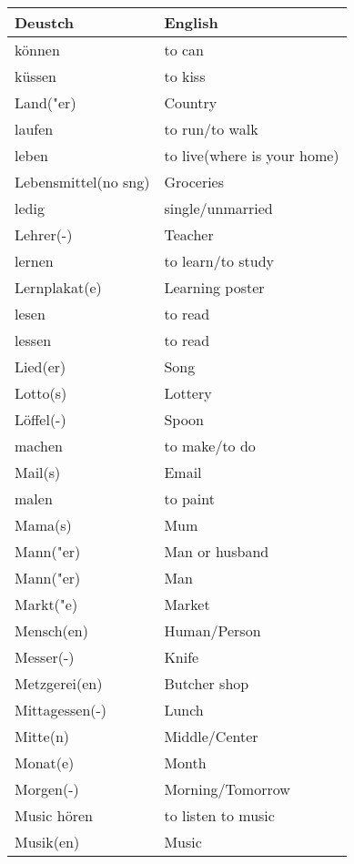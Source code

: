 \documentclass{article}
\renewcommand{\arraystretch}{1}
\begin{document}
\newpage

\begin{minipage}{0.48\textwidth}
    \centering
    \renewcommand{\arraystretch}{1.5}
    \begin{tabular}{|>{\raggedright\arraybackslash}p{3.5cm}|>{\raggedright\arraybackslash}p{3.5cm}|}
        \hline
        \rowcolor{gray!20} \textbf{Deustch} & \textbf{English} \\
        \hline
        können & to can \\\hline
        küssen & to kiss \\\hline
        Land("er) & Country \\\hline
        laufen & to run/to walk \\\hline
        leben & to live(where is your home) \\\hline
        Lebensmittel(no sng) & Groceries \\\hline
        ledig & single/unmarried \\\hline
        Lehrer(-) & Teacher \\\hline
        lernen & to learn/to study \\\hline
        Lernplakat(e) & Learning poster \\\hline
        lesen & to read \\\hline
        lessen & to read \\\hline
        Lied(er) & Song \\\hline
        Lotto(s) & Lottery \\\hline
        Löffel(-) & Spoon \\\hline
        machen & to make/to do \\\hline
        Mail(s) & Email \\\hline
        malen & to paint \\\hline
        Mama(s) & Mum \\\hline
        Mann("er) & Man or husband \\\hline
        Mann("er) & Man \\\hline
        Markt("e) & Market \\\hline
        Mensch(en) & Human/Person \\\hline
        Messer(-) & Knife \\\hline
        Metzgerei(en) & Butcher shop \\\hline
        Mittagessen(-) & Lunch \\\hline
        Mitte(n) & Middle/Center \\\hline
        Monat(e) & Month \\\hline
        Morgen(-) & Morning/Tomorrow \\\hline
        Music hören & to listen to music \\\hline
        Musik(en) & Music \\\hline
    \end{tabular}
\end{minipage}%
\end{document}
